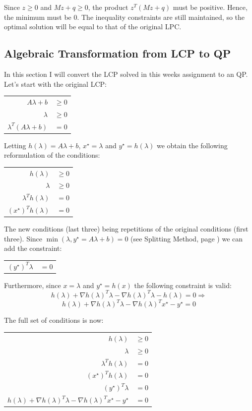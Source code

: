 \documentclass[10pt,oneside,a4paper,final,english]{memoir}
\begin{document}
Since $z\geq 0$ and $Mz+q\geq 0$, the product $z^T(Mz+q)$ must be
positive. Hence, the minimum must be $0$. The inequality constraints
are still maintained, so the optimal solution will be equal to that of
the original LPC.

\subsection{Algebraic Transformation from LCP to QP}
In this section I will convert the LCP solved in this weeks assignment
to an QP. Let's start with the original LCP:
\begin{center}\begin{tabular}{rl}
$A\lambda + b$ & $\geq 0$ \\
$\lambda$ & $\geq 0$\\
$\lambda^T (A\lambda + b)$ & $= 0$
\end{tabular}\end{center}

Letting $h(\lambda) = A\lambda + b$, $x^\star = \lambda$ and $y^\star
= h(\lambda)$ we obtain the following reformulation of the
conditions:
\begin{center}\begin{tabular}{rl}
$h(\lambda)$ & $\geq 0$ \\
$\lambda$ & $\geq 0$\\
$\lambda^T h(\lambda)$ & $= 0$\\

$(x^\star)^T h(\lambda)$&$= 0$
\end{tabular}\end{center}

The new conditions (last three) being repetitions of the original
conditions (first three). Since $\min(\lambda, y^\star = A\lambda+b) =
0$ (see Splitting Method, page \pageref{splitting}) we can add the
constraint:
\begin{center}\begin{tabular}{rl}
    $(y^\star)^T \lambda $&$= 0$
\end{tabular}\end{center}

Furthermore, since $x = \lambda$ and $y^\star = h(x)$ the following
constraint is valid:
\[ h(\lambda) + \nabla h(\lambda)^T \lambda - \nabla h(\lambda)^T
\lambda - h(\lambda) = 0 \Rightarrow\]
\[ h(\lambda) + \nabla h(\lambda)^T \lambda - \nabla h(\lambda)^T
x^\star - y^\star = 0 \]

The full set of conditions is now:
\begin{center}\begin{tabular}{rl}
$h(\lambda)$ & $\geq 0$ \\
$\lambda$ & $\geq 0$\\
$\lambda^T h(\lambda)$ & $= 0$\\

$(x^\star)^T h(\lambda)$&$= 0$ \\

$(y^\star)^T \lambda $&$= 0$ \\

$h(\lambda) + \nabla h(\lambda)^T \lambda - \nabla h(\lambda)^T
x^\star - y^\star $&$= 0$
\end{tabular}\end{center}
\end{document}
